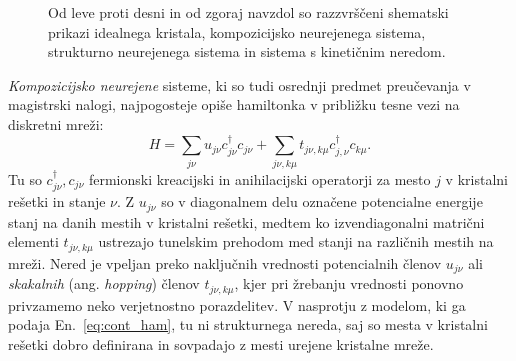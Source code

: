 \begin{minipage}[t]{0.43\textwidth}
\begin{figure}[H]
\caption{Od leve proti desni in od zgoraj navzdol so razzvrščeni shematski prikazi idealnega kristala, kompozicijsko neurejenega sistema, strukturno neurejenega sistema in sistema s kinetičnim neredom.  }
\label{fig:disorder_scheme} 
\end{figure}
\end{minipage}
\emph{Kompozicijsko neurejene} sisteme, ki so tudi osrednji predmet preučevanja v magistrski nalogi, najpogosteje opiše hamiltonka v približku tesne vezi na diskretni mreži:
\begin{equation}\label{eq:disc_ham}
H=\sum\limits_{j\nu}u_{j\nu}c^\dagger_{j\nu}c_{j\nu} + \sum\limits_{j\nu, k\mu} t_{j\nu, k\mu} c^\dagger_{j,\nu}c_{k\mu}.
\end{equation}
Tu so $c^\dagger_{j\nu}, c_{j\nu}$ fermionski kreacijski in anihilacijski operatorji za mesto $j$ v kristalni rešetki in stanje $\nu$. Z $u_{j\nu}$ so v diagonalnem delu označene potencialne energije stanj na danih mestih v kristalni rešetki, medtem ko izvendiagonalni matrični elementi $t_{j\nu, k\mu}$ ustrezajo tunelskim prehodom med stanji na različnih mestih na mreži. Nered je vpeljan preko naključnih vrednosti potencialnih členov $u_{j\nu}$ ali \emph{skakalnih} (ang. \emph{hopping}) členov $t_{j\nu, k\mu}$, kjer pri žrebanju vrednosti ponovno privzamemo neko verjetnostno porazdelitev. V nasprotju z modelom, ki ga podaja En.~\eqref{eq:cont_ham}, tu ni strukturnega nereda, saj so mesta v kristalni rešetki dobro definirana in sovpadajo z mesti urejene kristalne mreže.  \\\\
